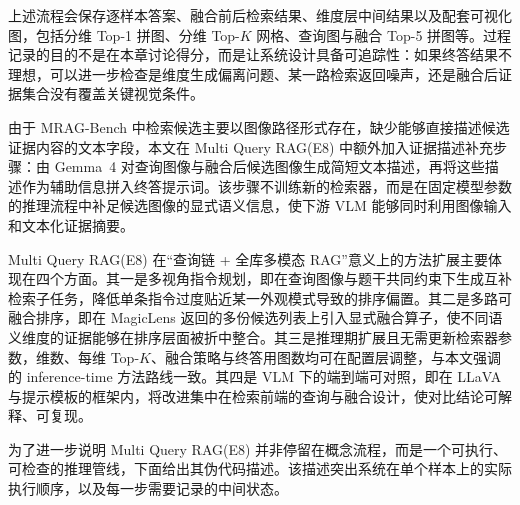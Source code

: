 上述流程会保存逐样本答案、融合前后检索结果、维度层中间结果以及配套可视化图，包括分维 Top-1 拼图、分维 Top-$K$ 网格、查询图与融合 Top-5 拼图等。过程记录的目的不是在本章讨论得分，而是让系统设计具备可追踪性：如果终答结果不理想，可以进一步检查是维度生成偏离问题、某一路检索返回噪声，还是融合后证据集合没有覆盖关键视觉条件。

由于 MRAG-Bench 中检索候选主要以图像路径形式存在，缺少能够直接描述候选证据内容的文本字段，本文在 Multi Query RAG(E8) 中额外加入证据描述补充步骤：由 Gemma~4 对查询图像与融合后候选图像生成简短文本描述，再将这些描述作为辅助信息拼入终答提示词。该步骤不训练新的检索器，而是在固定模型参数的推理流程中补足候选图像的显式语义信息，使下游 VLM 能够同时利用图像输入和文本化证据摘要。

Multi Query RAG(E8) 在“查询链 + 全库多模态 RAG”意义上的方法扩展主要体现在四个方面。其一是多视角指令规划，即在查询图像与题干共同约束下生成互补检索子任务，降低单条指令过度贴近某一外观模式导致的排序偏置。其二是多路可融合排序，即在 MagicLens 返回的多份候选列表上引入显式融合算子，使不同语义维度的证据能够在排序层面被折中整合。其三是推理期扩展且无需更新检索器参数，维数、每维 Top-$K$、融合策略与终答用图数均可在配置层调整，与本文强调的 inference-time 方法路线一致。其四是 VLM 下的端到端可对照，即在 LLaVA 与提示模板的框架内，将改进集中在检索前端的查询与融合设计，使对比结论可解释、可复现。

为了进一步说明 Multi Query RAG(E8) 并非停留在概念流程，而是一个可执行、可检查的推理管线，下面给出其伪代码描述。该描述突出系统在单个样本上的实际执行顺序，以及每一步需要记录的中间状态。

